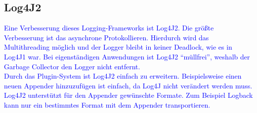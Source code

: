 \subsection{Log4J2}\label{subsec:log4j2}
\textcolor{blue}{
    Eine Verbesserung dieses Logging-Frameworks ist Log4J2.
    Die größte Verbesserung ist das asynchrone Protokollieren.
    Hierdurch wird das Multithreading möglich und der Logger bleibt in keiner Deadlock, wie es in Log4J1 war.
    Bei eigenständigen Anwendungen ist Log4J2 \enquote{müllfrei}, weshalb der Garbage Collector den Logger nicht entfernt.
    \\
    Durch das Plugin-System ist Log4J2 einfach zu erweitern.
    Beispielsweise einen neuen Appender hinzuzufügen ist einfach, da Log4J nicht verändert werden muss.
    Log4J2 unterstützt für den Appender gewünschte Formate.
    Zum Beispiel Logback kann nur ein bestimmtes Format mit dem Appender transportieren.
}\autocite{log4j2, baeldung}


